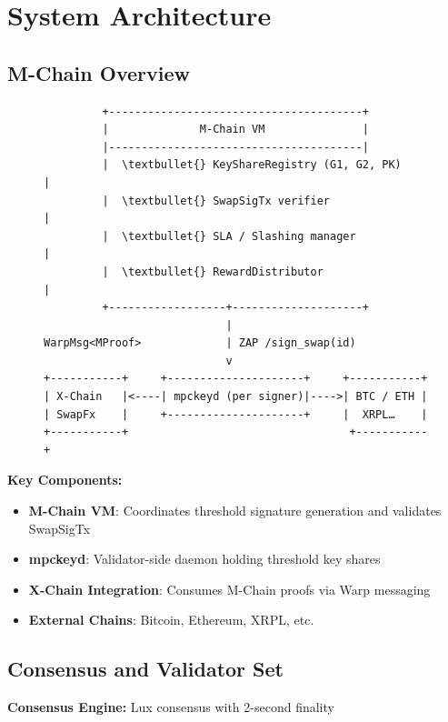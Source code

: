 \section{System Architecture}


\subsection{M-Chain Overview}

\begin{figure}[h]
\centering
\begin{verbatim}
         +---------------------------------------+
         |              M-Chain VM               |
         |---------------------------------------|
         |  \textbullet{} KeyShareRegistry (G1, G2, PK)      |
         |  \textbullet{} SwapSigTx verifier                 |
         |  \textbullet{} SLA / Slashing manager             |
         |  \textbullet{} RewardDistributor                  |
         +------------------+--------------------+
                            |
WarpMsg<MProof>             | ZAP /sign_swap(id)
                            v
+-----------+     +---------------------+     +-----------+
| X-Chain   |<----| mpckeyd (per signer)|---->| BTC / ETH |
| SwapFx    |     +---------------------+     |  XRPL…    |
+-----------+                                  +-----------+
\end{verbatim}

\label{fig:architecture}
\end{figure}

\textbf{Key Components:}
\begin{itemize}
\item \textbf{M-Chain VM}: Coordinates threshold signature generation and validates SwapSigTx
\item \textbf{mpckeyd}: Validator-side daemon holding threshold key shares
\item \textbf{X-Chain Integration}: Consumes M-Chain proofs via Warp messaging
\item \textbf{External Chains}: Bitcoin, Ethereum, XRPL, etc.
\end{itemize}

\subsection{Consensus and Validator Set}

\textbf{Consensus Engine:} Lux consensus with 2-second finality

